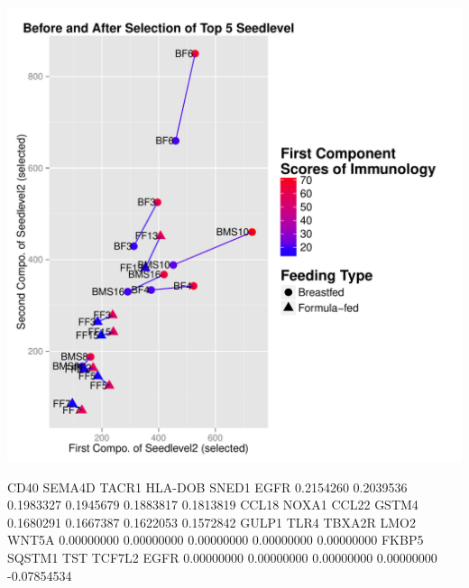 \documentclass{article}\usepackage[]{graphicx}\usepackage[]{color}
\makeatletter
\def\maxwidth{ %
  \ifdim\Gin@nat@width>\linewidth
    \linewidth
  \else
    \Gin@nat@width
  \fi
}
\makeatother
\begin{document}
\begin{Schunk}
{}



{\centering \includegraphics[width=\maxwidth]{figure/Nov_25-3} 

}

\begin{Soutput}
     CD40    SEMA4D     TACR1   HLA-DOB     SNED1      EGFR 
0.2154260 0.2039536 0.1983327 0.1945679 0.1883817 0.1813819 
    CCL18     NOXA1     CCL22     GSTM4 
0.1680291 0.1667387 0.1622053 0.1572842 
      GULP1        TLR4      TBXA2R        LMO2       WNT5A 
 0.00000000  0.00000000  0.00000000  0.00000000  0.00000000 
      FKBP5      SQSTM1         TST      TCF7L2        EGFR 
 0.00000000  0.00000000  0.00000000  0.00000000 -0.07854534 
\end{Soutput}
\end{Schunk}
\end{document}
